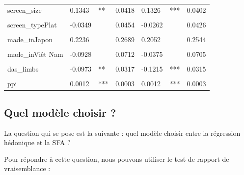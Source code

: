 \documentclass[
  12pt,
]{report}
\begin{document}
\begin{table}[!h]
\begin{tabular}[t]{lllllll}
screen\_size & 0.1343 & ** & 0.0418 & 0.1326 & *** & 0.0402\\
\cellcolor{gray!10}{screen\_typeBords incurvés} & \cellcolor{gray!10}{-0.1086} & \cellcolor{gray!10}{} & \cellcolor{gray!10}{0.1109} & \cellcolor{gray!10}{-0.0897} & \cellcolor{gray!10}{} & \cellcolor{gray!10}{0.1076}\\
screen\_typePlat & -0.0349 &  & 0.0454 & -0.0262 &  & 0.0426\\
\cellcolor{gray!10}{screen\_typePliable} & \cellcolor{gray!10}{0.3733} & \cellcolor{gray!10}{***} & \cellcolor{gray!10}{0.0738} & \cellcolor{gray!10}{0.3778} & \cellcolor{gray!10}{***} & \cellcolor{gray!10}{0.0702}\\
\addlinespace
made\_inJapon & 0.2236 &  & 0.2689 & 0.2052 &  & 0.2544\\
\cellcolor{gray!10}{made\_inThaïlande} & \cellcolor{gray!10}{0.6981} & \cellcolor{gray!10}{***} & \cellcolor{gray!10}{0.1551} & \cellcolor{gray!10}{0.6992} & \cellcolor{gray!10}{***} & \cellcolor{gray!10}{0.1472}\\
made\_inViêt Nam & -0.0928 &  & 0.0712 & -0.0375 &  & 0.0705\\
\cellcolor{gray!10}{upgrade\_storageTRUE} & \cellcolor{gray!10}{-0.2819} & \cellcolor{gray!10}{***} & \cellcolor{gray!10}{0.0472} & \cellcolor{gray!10}{-0.2619} & \cellcolor{gray!10}{***} & \cellcolor{gray!10}{0.0455}\\
das\_limbs & -0.0973 & ** & 0.0317 & -0.1215 & *** & 0.0315\\
\addlinespace
\cellcolor{gray!10}{network5G} & \cellcolor{gray!10}{0.1973} & \cellcolor{gray!10}{***} & \cellcolor{gray!10}{0.0398} & \cellcolor{gray!10}{0.2022} & \cellcolor{gray!10}{***} & \cellcolor{gray!10}{0.0382}\\
ppi & 0.0012 & *** & 0.0003 & 0.0012 & *** & 0.0003\\
\bottomrule
\end{tabular}
\end{table}

\newpage

\subsection{Quel modèle choisir ?}\label{quel-moduxe8le-choisir}

La question qui se pose est la suivante : quel modèle choisir entre la
régression hédonique et la SFA ?

Pour répondre à cette question, nous pouvons utiliser le test de rapport
de vraisemblance :
\end{document}
